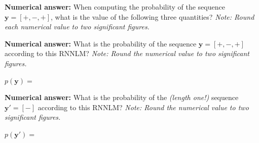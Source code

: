 \documentclass[11pt,addpoints,answers]{exam}
\numberwithin{equation}{section} %
\numberwithin{figure}{section} %
\numberwithin{table}{section} %
\newcommand{\yv}{\mathbf{y}}
\begin{document}
\begin{questions}
\question \textbf{Numerical answer:} When computing the probability of the sequence $\yv = [+, -, +]$, what is the value of the following three quantities? \emph{Note: Round each numerical value to two significant figures.}

\question[1] \textbf{Numerical answer:} What is the probability of the sequence $\yv = [+, -, +]$ according to this RNNLM? \emph{Note: Round the numerical value to two significant figures.}
    
    $p(\yv) = \quad$
    \begin{tcolorbox}[fit,height=1cm, width=2cm, blank, borderline={1pt}{-2pt}, nobeforeafter]
    \end{tcolorbox}

\question[1] \textbf{Numerical answer:} What is the probability of the \emph{(length one!)} sequence $\yv' = [-]$ according to this RNNLM? \emph{Note: Round the numerical value to two significant figures.}
    
    $p(\yv') = \quad$
    \begin{tcolorbox}[fit,height=1cm, width=2cm, blank, borderline={1pt}{-2pt}, nobeforeafter]
    \end{tcolorbox}
    
    



\end{questions}
\end{document}
